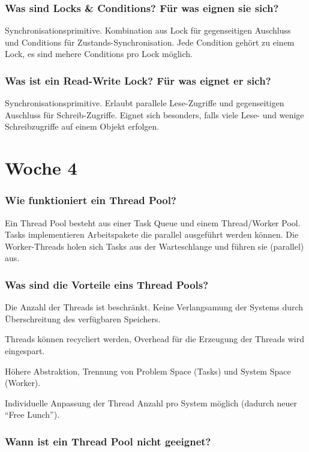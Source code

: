 \documentclass[10pt,a4paper]{scrartcl}
\begin{document}
\subsubsection{Was sind Locks \& Conditions? Für was eignen sie sich?}

Synchronisationsprimitive. Kombination aus Lock für gegenseitigen Auschluss und Conditions für
Zustands-Synchronisation. Jede Condition gehört zu einem Lock, es sind mehere Conditions pro Lock
möglich.
  
\subsubsection{Was ist ein Read-Write Lock? Für was eignet er sich?}

Synchronisationsprimitive. Erlaubt parallele Lese-Zugriffe und gegenseitigen Auschluss für
Schreib-Zugriffe. Eignet sich besonders, falls viele Lese- und wenige Schreibzugriffe auf einem
Objekt erfolgen.


\section{Woche 4}

\subsubsection{Wie funktioniert ein Thread Pool?}

Ein Thread Pool besteht aus einer Task Queue und einem Thread/Worker Pool. Tasks implementieren
Arbeitspakete die parallel ausgeführt werden können. Die Worker-Threads holen sich Tasks aus der
Warteschlange und führen sie (parallel) aus.
  
\subsubsection{Was sind die Vorteile eins Thread Pools?}

Die Anzahl der Threads ist beschränkt. Keine Verlangsamung der Systems durch Überschreitung des
verfügbaren Speichers.

Threads können recycliert werden, Overhead für die Erzeugung der Threads wird eingespart.

Höhere Abstraktion, Trennung von Problem Space (Tasks) und System Space (Worker).

Individuelle Anpassung der Thread Anzahl pro System möglich (dadurch neuer "`Free Lunch"').
  
\subsubsection{Wann ist ein Thread Pool nicht geeignet?}
\end{document}
